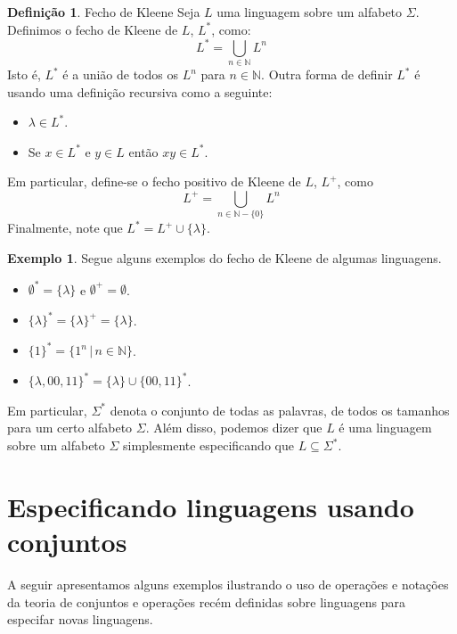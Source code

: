 \documentclass[a4paper]{article}
\theoremstyle{definition}
\newtheorem{Example}{Exemplo}
\newtheorem{Definition}{Definição}
\begin{document}
  \begin{Definition}{Fecho de Kleene}
    Seja $L$ uma linguagem sobre um alfabeto $\Sigma$. Definimos o fecho de
    Kleene de $L$, $L^*$, como:
    \[
      L^* = \bigcup_{n \in\mathbb{N}}L^n
    \]
    Isto é, $L^*$ é a união de todos os $L^n$ para $n \in \mathbb{N}$. Outra
    forma de definir $L^*$ é usando uma definição recursiva como a seguinte:
    \begin{itemize}
       \item $\lambda \in L^*$.
       \item Se $x \in L^*$ e $y \in L$ então $xy \in L^*$.
    \end{itemize}
    Em particular, define-se o fecho positivo de Kleene de $L$, $L^+$, como
    \[
      L^+ = \bigcup_{n \in\mathbb{N} - \{0\}}L^n
    \]
    Finalmente, note que $L^* = L^+ \cup \{\lambda\}$.
  \end{Definition}

  \begin{Example}
    Segue alguns exemplos do fecho de Kleene de algumas linguagens.
    \begin{itemize}
      \item $\emptyset^* = \{\lambda\}$ e $\emptyset^+ = \emptyset$.
      \item $\{\lambda\}^* = \{\lambda\}^+ = \{\lambda\}$.
      \item $\{1\}^* = \{1^n\,|\,n \in \mathbb{N}\}$.
      \item $\{\lambda,00,11\}^* = \{\lambda\} \cup \{00,11\}^*$.
    \end{itemize}
    Em particular, $\Sigma^*$ denota o conjunto de todas as palavras,
    de todos os tamanhos para um certo alfabeto $\Sigma$. Além disso,
    podemos dizer que $L$ é uma linguagem sobre um alfabeto $\Sigma$
    simplesmente especificando que $L \subseteq \Sigma^*$.
  \end{Example}

  \section{Especificando linguagens usando conjuntos}

  A seguir apresentamos alguns exemplos ilustrando o uso de operações
  e notações da teoria de conjuntos e operações recém definidas sobre
  linguagens para especifar novas linguagens.
\end{document}
